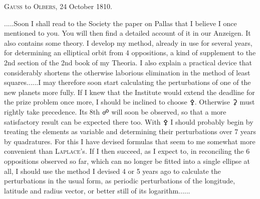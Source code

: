\par\bigskip
\begin{center}
\textsc{Gauss} to \textsc{Olbers}, 24 October 1810.
\end{center}
\noindent\hspace*{\parindent}.\quad.\quad.\quad.\quad.\quad Soon I shall read to the Society the paper\HistoricalNoteEight{See vol. VI, p. 1.]} on Pallas that I believe I once mentioned to you. You will then find a detailed account of it in our Anzeigen. It also contains some theory. I develop my method, already in use for several years, for determining an elliptical orbit from 4 oppositions, a kind of supplement to the 2nd section of the 2nd book of my Theoria. I also explain a practical device that considerably shortens the otherwise laborious elimination in the method of least squares.\quad.\quad.\quad.\quad.\quad.\quad I may therefore soon start calculating the perturbations of one of the new planets more fully. If I knew that the Institute would extend the deadline for the prize problem once more, I should be inclined to choose {\AstroSymbols ⚴}. Otherwise {\AstroSymbols ⚳} must rightly take precedence. Its 8th {\AstroSymbols ☍} will soon be observed, so that a more satisfactory result can be expected there too. With {\AstroSymbols ⚴} I should probably begin by treating the elements as variable and determining their perturbations over 7 years by quadratures. For this I have devised formulas that seem to me somewhat more convenient than \textsc{Laplace}'s. If I then succeed, as I expect to, in reconciling the 6 oppositions observed so far, which can no longer be fitted into a single ellipse at all, I should use the method I devised 4 or 5 years ago to calculate the perturbations in the usual form, as periodic perturbations of the longitude, latitude and radius vector, or better still of its logarithm.\quad.\quad.\quad.\quad.\quad.
\par
